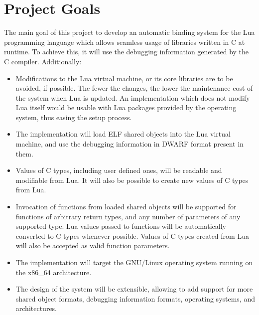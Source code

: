 

\section{Project Goals}
	\label{sec:project-goals}

The main goal of this project to develop an automatic binding system for the
Lua programming language which allows seamless usage of libraries written in
C at runtime. To achieve this, it will use the debugging information generated
by the C compiler. Additionally:

\begin{itemize}

	\item Modifications to the Lua virtual machine, or its core libraries are to
	be avoided, if possible. The fewer the changes, the lower the maintenance
	cost of the system when Lua is updated. An implementation which does not
	modify Lua itself would be usable with Lua packages provided by the
	operating system, thus easing the setup process.

	\item The implementation will load \gls{ELF} shared objects into the Lua
	virtual machine, and use the debugging information in \gls{DWARF} format
	present in them.

	\item Values of C types, including user defined ones, will be readable and
	modifiable from Lua. It will also be possible to create new values of
	C types from Lua.

	\item Invocation of functions from loaded shared objects will be supported
	for functions of arbitrary return types, and any number of parameters of any
	supported type. Lua values passed to functions will be automatically
	converted to C types whenever possible. Values of C types created from Lua
	will also be accepted as valid function parameters.

	\item The implementation will target the GNU/Linux operating system running
	on the x86\_64 architecture.

	\item The design of the system will be extensible, allowing to add support
	for more shared object formats, debugging information formats, operating
	systems, and architectures.

\end{itemize}


